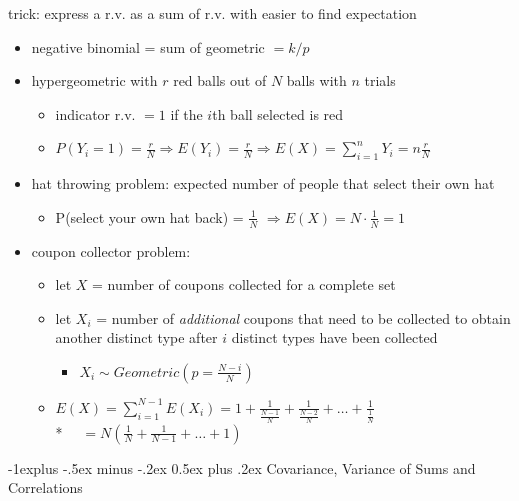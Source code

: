 \documentclass[10pt, landscape]{article}
\makeatletter
\renewcommand{\subsection}{\@startsection{subsection}{2}{0mm}%
  {-1explus -.5ex minus -.2ex}%
  {0.5ex plus .2ex}%
{\normalfont\normalsize\bfseries}}
\makeatother
\begin{document}
\begin{multicols*}{3}
    \attention trick: express a r.v. as a sum of r.v. with easier to find expectation

    \begin{itemize}
      \item negative binomial = sum of geometric $= k/p$
      \item hypergeometric with $r$ red balls out of  $N$ balls  with $n$ trials
        \begin{itemize}
          \item indicator r.v. $=1$ if the $i$th ball selected is red \item $P(Y_i = 1) = \frac{r}{N} \Rightarrow E(Y_i) = \frac{r}{N} \Rightarrow E(X) = \sum^n_{i=1}Y_i = n\frac{r}{N} $
        \end{itemize}
      \item hat throwing problem: expected number of people that select their own hat
        \begin{itemize}
          \item P(select your own hat back) = $\frac{1}{N}$ $\Rightarrow E(X) = N \cdot \frac{1}{N} = 1$
        \end{itemize}
      \item coupon collector problem: 
        \begin{itemize}
          \item let $X$ = number of coupons collected for a complete set
          \item let $X_i$ = number of \textit{additional} coupons that need to be collected to obtain another distinct type after $i$ distinct types have been collected 
            \begin{itemize}
              \item $X_i \sim Geometric(p = \frac{N-i}{N} )$
            \end{itemize}
          \item $E(X) = \sum^{N-1}_{i=1} E(X_i) = 1 + \frac{1}{\frac{N-1}{N}} + \frac{1}{\frac{N-2}{N}} + \dots + \frac{1}{\frac{1}{N}}$ 
            \\* $ \quad = N(\frac{1}{N} + \frac{1}{N-1} + \dots + 1) $
        \end{itemize}
    \end{itemize}

    \subsection{Covariance, Variance of Sums and Correlations}


\end{multicols*}
\end{document}
